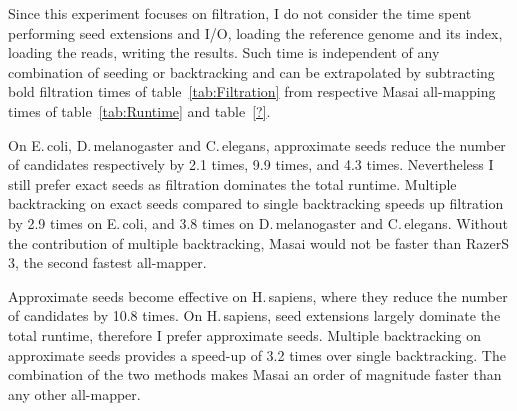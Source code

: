 Since this experiment focuses on filtration, I do not consider the time spent performing seed extensions and I/O, \ie loading the reference genome and its index, loading the reads, writing the results.
Such time is independent of any combination of seeding or backtracking and can be extrapolated by subtracting bold filtration times of table~\ref{tab:Filtration} from respective Masai all-mapping times of table~\ref{tab:Runtime} and table~\ref{?}.

On E.\,coli, D.\,melanogaster and C.\,elegans, approximate seeds reduce the number of candidates respectively by 2.1 times, 9.9 times, and 4.3 times.
Nevertheless I still prefer exact seeds as filtration dominates the total runtime.
Multiple backtracking on exact seeds compared to single backtracking speeds up filtration by 2.9 times on E.\,coli, and 3.8 times on D.\,melanogaster and C.\,elegans.
Without the contribution of multiple backtracking, Masai would not be faster than RazerS\,3, the second fastest all-mapper.

Approximate seeds become effective on H.\,sapiens, where they reduce the number of candidates by 10.8 times. 
On H.\,sapiens, seed extensions largely dominate the total runtime, therefore I prefer approximate seeds.
Multiple backtracking on approximate seeds provides a speed-up of 3.2 times over single backtracking.
The combination of the two methods makes Masai an order of magnitude faster than any other all-mapper.

